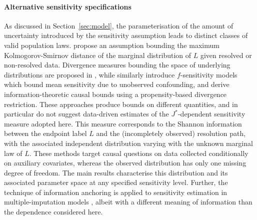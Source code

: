 \paragraph{Alternative sensitivity specifications} 
As discussed in Section~\ref{sec:model}, the parameterisation of the amount of uncertainty introduced by the sensitivity assumption leads to distinct classes of valid population laws. \citet{kline2013} propose an assumption bounding the maximum Kolmogorov-Smirnov distance of the marginal distribution of $L$ given resolved or non-resolved data. Divergence measures bounding the space of underlying distributions are proposed in \citep{christensen2023}, while \citet{jin2026} similarly introduce $f$-sensitivity models which bound mean sensitivity due to unobserved confounding, and \citet{jung2026} derive information-theoretic causal bounds using a propensity-based divergence restriction. These approaches produce bounds on different quantities, and in particular do not suggest data-driven estimates of the $J^*$-dependent sensitivity measure adopted here. This measure corresponds to the Shannon information between the endpoint label $L$ and the (incompletely observed) resolution path, with the associated independent distribution varying with the unknown marginal law of $L$. These methods target causal questions on data collected conditionally on auxiliary covariates, whereas the observed distribution has only one missing degree of freedom. The main results characterise this distribution and its associated parameter space at any specified sensitivity level. Further, the technique of information anchoring is applied to sensitivity estimation in multiple-imputation models \citep{cro2019}, albeit with a different meaning of information than the dependence considered here.

